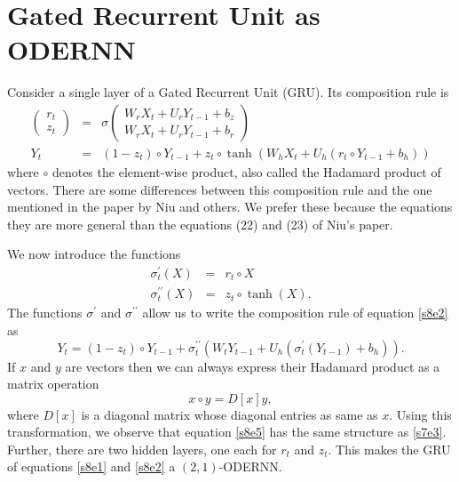 \documentclass{article}
\numberwithin{equation}{section}
\begin{document}
\section{Gated Recurrent Unit as ODERNN}\label{s8}
Consider a single layer of a Gated Recurrent Unit (GRU). Its composition
rule is\cite{gereon2018hands}
\begin{eqnarray}
\begin{pmatrix} r_t \\ z_t \end{pmatrix} &=&
\sigma
\begin{pmatrix}
    W_r X_t + U_r Y_{t-1} + b_z \\ 
    W_rX_t + U_rY_{t-1} + b_r
\end{pmatrix} \label{s8e1} \\
Y_t &=& (1 - z_t) \circ Y_{t-1} + 
 z_t \circ \tanh(W_hX_t + U_h(r_t \circ Y_{t-1} + b_h)) \label{s8e2}
\end{eqnarray}
where $\circ$ denotes the element-wise product, also called the Hadamard
product of vectors. There are some differences between this composition
rule and the one mentioned in the paper\cite{niu2019recurrent} by Niu and 
others. We prefer these because the equations they are more general than
the equations (22) and (23) of Niu's paper.

We now introduce the functions
\begin{eqnarray}
\sigma_t^\prime(X) &=& r_t \circ X \label{s8e3} \\
\sigma_t^{\prime\prime}(X) &=& z_t \circ \tanh(X). \label{s8e4}
\end{eqnarray}
The functions $\sigma^\prime$ and $\sigma^{\prime\prime}$ allow us to 
write the composition rule of equation \eqref{s8e2} as
\begin{equation}\label{s8e5}
Y_t = (1 - z_t) \circ Y_{t-1} + \sigma_t^{\prime\prime}\left(
	W_tY_{t-1} + U_h(\sigma_t^\prime(Y_{t-1}) + b_h)\right).
\end{equation}
If $x$ and $y$ are vectors then we can always express their Hadamard 
product as a matrix operation
\begin{equation}\label{s8e6}
x \circ y = D[x]y,
\end{equation}
where $D[x]$ is a diagonal matrix whose diagonal entries as same as $x$.
Using this transformation, we observe that equation \eqref{s8e5} has the
same structure as \eqref{s7e3}. Further, there are two hidden layers, 
one each for $r_t$ and $z_t$. This makes the GRU of equations \eqref{s8e1}
and \eqref{s8e2} a $(2, 1)$-ODERNN.
\end{document}
